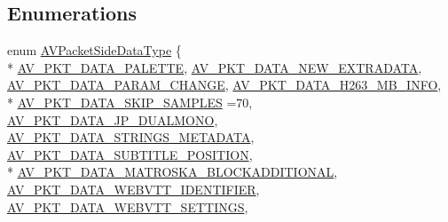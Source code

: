 \subsection*{Enumerations}
\begin{DoxyCompactItemize}
\item 
enum \hyperlink{group__lavc__packet_ga9a80bfcacc586b483a973272800edb97}{A\+V\+Packet\+Side\+Data\+Type} \{ \\*
\hyperlink{group__lavc__packet_gga9a80bfcacc586b483a973272800edb97a9b3c18a18a684fcbb1a2cc25cc6869dd}{A\+V\+\_\+\+P\+K\+T\+\_\+\+D\+A\+T\+A\+\_\+\+P\+A\+L\+E\+T\+TE}, 
\hyperlink{group__lavc__packet_gga9a80bfcacc586b483a973272800edb97ad353d4a7841087354593a97bef92841a}{A\+V\+\_\+\+P\+K\+T\+\_\+\+D\+A\+T\+A\+\_\+\+N\+E\+W\+\_\+\+E\+X\+T\+R\+A\+D\+A\+TA}, 
\hyperlink{group__lavc__packet_gga9a80bfcacc586b483a973272800edb97ad42d2eb8c04516552e0c422257192bc0}{A\+V\+\_\+\+P\+K\+T\+\_\+\+D\+A\+T\+A\+\_\+\+P\+A\+R\+A\+M\+\_\+\+C\+H\+A\+N\+GE}, 
\hyperlink{group__lavc__packet_gga9a80bfcacc586b483a973272800edb97a48dc789fa9d31046e153233374f52b86}{A\+V\+\_\+\+P\+K\+T\+\_\+\+D\+A\+T\+A\+\_\+\+H263\+\_\+\+M\+B\+\_\+\+I\+N\+FO}, 
\\*
\hyperlink{group__lavc__packet_gga9a80bfcacc586b483a973272800edb97a2093332d8086d25a04942ede61007f6a}{A\+V\+\_\+\+P\+K\+T\+\_\+\+D\+A\+T\+A\+\_\+\+S\+K\+I\+P\+\_\+\+S\+A\+M\+P\+L\+ES} =70, 
\hyperlink{group__lavc__packet_gga9a80bfcacc586b483a973272800edb97a0933bb1f539acca421bfaa293cb3ee95}{A\+V\+\_\+\+P\+K\+T\+\_\+\+D\+A\+T\+A\+\_\+\+J\+P\+\_\+\+D\+U\+A\+L\+M\+O\+NO}, 
\hyperlink{group__lavc__packet_gga9a80bfcacc586b483a973272800edb97a18d2e9d2c572fbe22a5880176fc41e9a}{A\+V\+\_\+\+P\+K\+T\+\_\+\+D\+A\+T\+A\+\_\+\+S\+T\+R\+I\+N\+G\+S\+\_\+\+M\+E\+T\+A\+D\+A\+TA}, 
\hyperlink{group__lavc__packet_gga9a80bfcacc586b483a973272800edb97a94c6e44bd31184da4d72ed4d322ffc69}{A\+V\+\_\+\+P\+K\+T\+\_\+\+D\+A\+T\+A\+\_\+\+S\+U\+B\+T\+I\+T\+L\+E\+\_\+\+P\+O\+S\+I\+T\+I\+ON}, 
\\*
\hyperlink{group__lavc__packet_gga9a80bfcacc586b483a973272800edb97a72e6d25102c0504549754fcd9ac871b7}{A\+V\+\_\+\+P\+K\+T\+\_\+\+D\+A\+T\+A\+\_\+\+M\+A\+T\+R\+O\+S\+K\+A\+\_\+\+B\+L\+O\+C\+K\+A\+D\+D\+I\+T\+I\+O\+N\+AL}, 
\hyperlink{group__lavc__packet_gga9a80bfcacc586b483a973272800edb97ad95c0f65ae13f5c2f03bf32accc5ecb2}{A\+V\+\_\+\+P\+K\+T\+\_\+\+D\+A\+T\+A\+\_\+\+W\+E\+B\+V\+T\+T\+\_\+\+I\+D\+E\+N\+T\+I\+F\+I\+ER}, 
\hyperlink{group__lavc__packet_gga9a80bfcacc586b483a973272800edb97a8dfefd91c6ee7f37af363a93a8211119}{A\+V\+\_\+\+P\+K\+T\+\_\+\+D\+A\+T\+A\+\_\+\+W\+E\+B\+V\+T\+T\+\_\+\+S\+E\+T\+T\+I\+N\+GS}, 

\end{DoxyCompactItemize}
